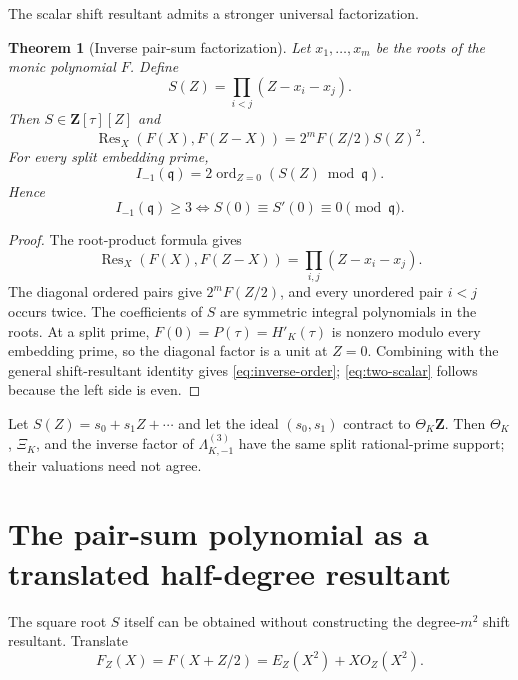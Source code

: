 \documentclass[11pt]{article}
\newtheorem{theorem}{Theorem}[section]
\newcommand{\Z}{\mathbf Z}
\newcommand{\Res}{\operatorname{Res}}
\newcommand{\ord}{\operatorname{ord}}
\begin{document}
The scalar shift resultant admits a stronger universal factorization.

\begin{theorem}[Inverse pair-sum factorization]\label{thm:pairsum}
Let $x_1,\ldots,x_m$ be the roots of the monic polynomial $F$.  Define
\[
S(Z)=\prod_{i<j}(Z-x_i-x_j).
\]
Then $S\in\Z[\tau][Z]$ and
\begin{equation}\label{eq:pairsquare}
\Res_X(F(X),F(Z-X))=2^mF(Z/2)S(Z)^2.
\end{equation}
For every split embedding prime,
\begin{equation}\label{eq:inverse-order}
I_{-1}(\mathfrak q)=2\ord_{Z=0}(S(Z)\bmod\mathfrak q).
\end{equation}
Hence
\begin{equation}\label{eq:two-scalar}
I_{-1}(\mathfrak q)\ge3
\iff
S(0)\equiv S'(0)\equiv0\pmod{\mathfrak q}.
\end{equation}
\end{theorem}

\begin{proof}
The root-product formula gives
\[
\Res_X(F(X),F(Z-X))=\prod_{i,j}(Z-x_i-x_j).
\]
The diagonal ordered pairs give $2^mF(Z/2)$, and every unordered pair $i<j$
occurs twice.  The coefficients of $S$ are symmetric integral polynomials in
the roots.  At a split prime, $F(0)=P(\tau)=H'_K(\tau)$ is nonzero modulo every
embedding prime, so the diagonal factor is a unit at $Z=0$.  Combining with the
general shift-resultant identity gives \eqref{eq:inverse-order};
\eqref{eq:two-scalar} follows because the left side is even.
\end{proof}

Let $S(Z)=s_0+s_1Z+\cdots$ and let the ideal $(s_0,s_1)$ contract to
$\Theta_K\Z$.  Then $\Theta_K$, $\Xi_K$, and the inverse factor of
$\Lambda_{K,-1}^{(3)}$ have the same split rational-prime support; their
valuations need not agree.

\section{The pair-sum polynomial as a translated half-degree resultant}

The square root $S$ itself can be obtained without constructing the
degree-$m^2$ shift resultant.  Translate
\begin{equation}\label{eq:translatedF}
F_Z(X)=F(X+Z/2)=E_Z(X^2)+XO_Z(X^2).
\end{equation}
\end{document}
